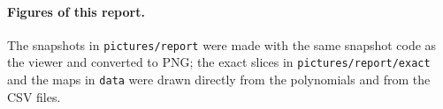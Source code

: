 \documentclass[12pt, a4paper]{article}
\theoremstyle{plain}
\theoremstyle{definition}
\theoremstyle{remark}
\theoremstyle{definition}
\begin{document}
\paragraph{Figures of this report.} The snapshots in \texttt{pictures/report} were
made with the same snapshot code as the viewer and converted to PNG; the exact
slices in \texttt{pictures/report/exact} and the maps in \texttt{data} were drawn
directly from the polynomials and from the CSV files.



\end{document}

